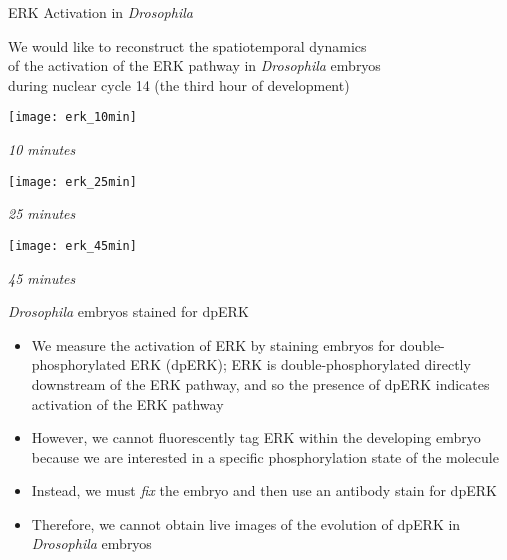 \begin{frame}{ERK Activation in {\em Drosophila}}
	
	\centering
	We would like to reconstruct the spatiotemporal dynamics \\
	of the activation of the ERK pathway in {\em Drosophila} embryos\\
	during nuclear cycle 14 (the third hour of development)

    \centering
	\begin{minipage}{0.3\textwidth}
	    \texttt{[image: erk\_10min]}\\
	    {\scriptsize \em 10 minutes \par}
	\end{minipage}
	\begin{minipage}{0.3\textwidth}
	    \texttt{[image: erk\_25min]}\\
	    {\scriptsize \em 25 minutes \par}
	\end{minipage}
	\begin{minipage}{0.3\textwidth}
	    \texttt{[image: erk\_45min]}\\
	    {\scriptsize \em 45 minutes \par}
	\end{minipage}
	
	{\small {\em Drosophila} embryos stained for dpERK}
	
	\begin{itemize}
		\item We measure the activation of ERK by staining embryos for double-phosphorylated ERK (dpERK); ERK is double-phosphorylated  directly downstream of the ERK pathway, and so the presence of dpERK indicates activation of the ERK pathway
	
		\item However, we cannot fluorescently tag ERK within the developing embryo because we are interested in a specific phosphorylation state of the molecule
		
		\item Instead, we must {\em fix} the embryo and then use an antibody stain for dpERK
	
		\item Therefore, we cannot obtain live images of the evolution of dpERK in {\em Drosophila} embryos
	\end{itemize}
	
\end{frame}

